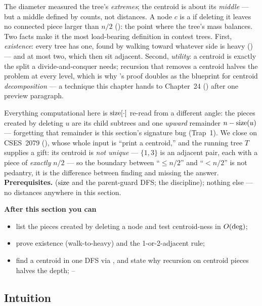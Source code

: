 \begin{topicintro}
The diameter measured the tree's \emph{extremes}; the centroid is about its
\emph{middle} --- but a middle defined by counts, not distances. A node $c$ is a
 if deleting it leaves no connected piece larger than $n/2$
(): the point where the tree's mass balances. Two facts make it the
most load-bearing definition in contest trees. First, \emph{existence}: every tree has
one, found by walking toward whatever side is heavy () --- and at
most two, which then sit adjacent. Second, \emph{utility}: a centroid is exactly the
split a divide-and-conquer needs; recursion that removes a centroid halves the problem
at every level, which is why 's proof doubles as the blueprint for
centroid \emph{decomposition} --- a technique this chapter hands to Chapter~24
() after one preview paragraph.

Everything computational here is $\operatorname{size}[\cdot]$ re-read from a different angle: the
pieces created by deleting $u$ are its child subtrees and one \emph{upward} remainder
$n-\operatorname{size}(u)$ --- forgetting that remainder is this section's signature bug (Trap~1). We
close on CSES~2079 (), whose whole input is ``print a centroid,'' and
the running tree $T$ supplies a gift: its centroid is \emph{not unique} --- $\{1,3\}$
is an adjacent pair, each with a piece of \emph{exactly} $n/2$ --- so the boundary
between ``$\le n/2$'' and ``$< n/2$'' is not pedantry, it is the difference between
finding and missing the answer.
\textbf{Prerequisites.}  ($\operatorname{size}$ and the parent-guard DFS; the
 discipline); nothing else --- no distances anywhere in this section.

\textbf{After this section you can}
\begin{itemize}[nosep]
  \item list the pieces created by deleting a node and test centroid-ness in $O(\deg)$; \hfill{}
  \item prove existence (walk-to-heavy) and the 1-or-2-adjacent rule; \hfill{}
  \item find a centroid in one DFS via , and state why recursion on
        centroid pieces halves the depth; \hfill{}--
\end{itemize}
\end{topicintro}

\subsection{Intuition}

